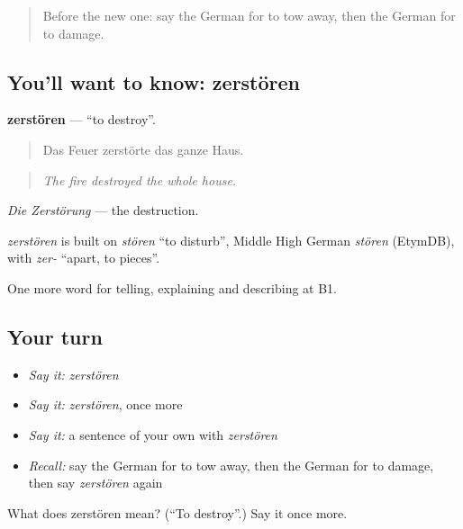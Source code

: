 \label{lesson:GE-C295-zerstoeren}



\begin{quote}
Before the new one: say the German for to tow away, then the German for to damage.
\end{quote}

\subsection*{You'll want to know: zerstören}
\textbf{zerstören} — \textquotedblleft{}to destroy\textquotedblright{}.

\begin{quote}
Das Feuer zerstörte das ganze Haus.
\end{quote}

\begin{quote}
\emph{The fire destroyed the whole house.}
\end{quote}

\emph{Die Zerstörung} — the destruction.

\begin{cousinweb}
\emph{zerstören} is built on \emph{stören} \textquotedblleft{}to disturb\textquotedblright{}, Middle High German \emph{stören} (EtymDB), with \emph{zer-} \textquotedblleft{}apart, to pieces\textquotedblright{}.
\end{cousinweb}

\begin{grammarlens}[title={What you've built}]
One more word for telling, explaining and describing at B1.
\end{grammarlens}

\subsection*{Your turn}
\begin{itemize}
\raggedright
  \item \emph{Say it:} \emph{zerstören}
  \item \emph{Say it:} \emph{zerstören}, once more
  \item \emph{Say it:} a sentence of your own with \emph{zerstören}
  \item \emph{Recall:} say the German for to tow away, then the German for to damage, then say \emph{zerstören} again
\end{itemize}

\begin{tcolorbox}[breakable,colback=teal!4,colframe=teal!35!black,title={Before you move on}]
What does zerstören mean? (\textquotedblleft{}To destroy\textquotedblright{}.) Say it once more.
\end{tcolorbox}
